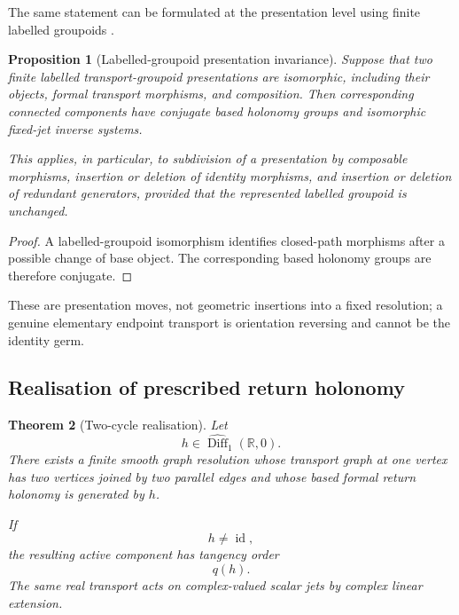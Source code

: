 \documentclass[11pt]{article}
\theoremstyle{plain}
\newtheorem{theorem}{Theorem}[section]
\newtheorem{proposition}[theorem]{Proposition}
\theoremstyle{definition}
\begin{document}
The same statement can be formulated at the presentation level using
finite labelled groupoids
\citep{MoerdijkMrcun2003}.

\begin{proposition}[Labelled-groupoid presentation invariance]
\label{prop:labelled-groupoid-invariance}
Suppose that two finite labelled transport-groupoid presentations are
isomorphic, including their objects, formal transport morphisms, and
composition. Then corresponding connected components have conjugate
based holonomy groups and isomorphic fixed-jet inverse systems.

This applies, in particular, to subdivision of a presentation by
composable morphisms, insertion or deletion of identity morphisms, and
insertion or deletion of redundant generators, provided that the
represented labelled groupoid is unchanged.
\end{proposition}

\begin{proof}
A labelled-groupoid isomorphism identifies closed-path morphisms after
a possible change of base object. The corresponding based holonomy
groups are therefore conjugate.
\end{proof}

These are presentation moves, not geometric insertions into a fixed resolution; a genuine elementary endpoint transport is orientation reversing and cannot be the identity germ.

\subsection{Realisation of prescribed return holonomy}
\label{subsec:two-cycle-realisation}



\begin{theorem}[Two-cycle realisation]
\label{thm:two-cycle-realisation}
Let
\[
  h
  \in
  \widehat{\operatorname{Diff}}_1(\mathbb R,0).
\]
There exists a finite smooth graph resolution whose transport graph at
one vertex has two vertices joined by two parallel edges and whose
based formal return holonomy is generated by \(h\).

If
\[
  h\neq\operatorname{id},
\]
the resulting active component has tangency order
\[
  q(h).
\]
The same real transport acts on complex-valued scalar jets by complex
linear extension.
\end{theorem}
\end{document}
